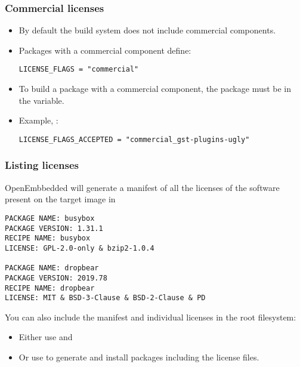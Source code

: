 \begin{frame}[fragile]
  \frametitle{Commercial licenses}
  \begin{itemize}
    \item By default the build system does not include commercial
      components.
    \item Packages with a commercial component define:
      \begin{block}{}
      \begin{verbatim}
LICENSE_FLAGS = "commercial"
      \end{verbatim}
      \end{block}
    \item To build a package with a commercial component, the package
      must be in the  variable.
    \item Example, :
      \begin{block}{}
      \begin{verbatim}
LICENSE_FLAGS_ACCEPTED = "commercial_gst-plugins-ugly"
      \end{verbatim}
      \end{block}
  \end{itemize}
\end{frame}

\begin{frame}[fragile]
  \frametitle{Listing licenses}
  OpenEmbbedded will generate a manifest of all the licenses of the
  software present on the target image in
  \begin{block}{}
    \fontsize{9}{9}\selectfont
    \begin{verbatim}
PACKAGE NAME: busybox
PACKAGE VERSION: 1.31.1
RECIPE NAME: busybox
LICENSE: GPL-2.0-only & bzip2-1.0.4

PACKAGE NAME: dropbear
PACKAGE VERSION: 2019.78
RECIPE NAME: dropbear
LICENSE: MIT & BSD-3-Clause & BSD-2-Clause & PD
    \end{verbatim}
  \end{block}

  You can also include the manifest and individual licenses in the root filesystem:
  \begin{itemize}
  \item Either use  and 
  \item Or use  to generate and install
    packages including the license files.
  \end{itemize}
\end{frame}

